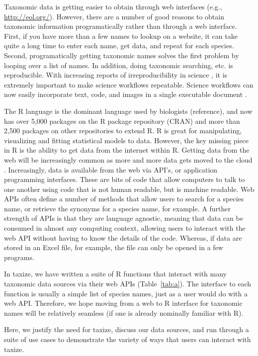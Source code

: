 \documentclass[letterpaper,superscriptaddress,showkeys,longbibliography,10pt]{revtex4-1}\usepackage{graphicx, color}
\begin{document}
Taxonomic data is getting easier to obtain through web interfaces (e.g., \url{http://eol.org/}). However, there are a number of good reasons to obtain taxonomic information programatically rather than through a web interface. First, if you have more than a few names to lookup on a website, it can take quite a long time to enter each name, get data, and repeat for each species. Second, programatically getting taxonomic names solves the first problem by looping over a list of names. In addition, doing taxonomic searching, etc. is reproducible. With increasing reports of irreproducibility in science \cite{stodden2010,zimmer2012}, it is extremely important to make science workflows repeatable. Science workflows can now easily incorporate text, code, and images in a single executable document \cite{Yihui2013}. 

The R language is the dominant language used by biologists (reference), and now has over 5,000 packages on the R package repository (CRAN) and more than 2,500 packages on other repositories to extend R. R is great for manipulating, visualizing and fitting statistical models to data. However, the key missing piece in R is the ability to get data from the internet within R. Getting data from the web will be increasingly common as more and more data gets moved to the cloud \cite{REF}. Increasingly, data is available from the web via API's, or application programming interfaces. These are bits of code that allow computers to talk to one another using code that is not human readable, but is machine readable. Web APIs often define a number of methods that allow users to search for a species name, or retrieve the synonyms for a species name, for example. A further strength of APIs is that they are language agnostic, meaning that data can be consumed in almost any computing context, allowing users to interact with the web API without having to know the details of the code. Whereas, if data are stored in an Excel file, for example, the file can only be opened in a few programs. 

In taxize, we have written a suite of R functions that interact with many taxonomic data sources via their web APIs (Table~\ref{tab:a}). The interface to each function is usually a simple list of species names, just as a user would do with a web API. Therefore, we hope moving from a web to R interface for taxonomic names will be relatively seamless (if one is already nominally familiar with R). 

Here, we justify the need for taxize, discuss our data sources, and run through a suite of use cases to demonstrate the variety of ways that users can interact with taxize. 
\end{document}
